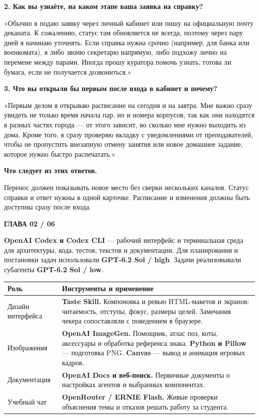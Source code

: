 \documentclass[11pt,a4paper]{article}
\newcommand{\chapterlabel}{Процесс создания}
\newcommand{\eyebrow}[1]{\textcolor{accent}{\small\bfseries #1}\par}
\newcommand{\display}[1]{{\displayfont\fontsize{28}{32}\selectfont #1\par}}
\newcommand{\chapterhead}[3]{%
  \gdef\chapterlabel{#2}%
  \hypertarget{chapter-#1}{}\label{chapter-#1}%
  \pdfbookmark[0]{#2. #3}{#1}%
  \eyebrow{ГЛАВА #2 / 06}\vspace{5pt}\display{#3}\vspace{7pt}}
\newcommand{\minorhead}[1]{\vspace{3pt}{\large\bfseries #1\par}\vspace{1pt}}
\newcommand{\shade}[2][sky]{%
  \par\noindent\colorbox{#1}{\parbox{\dimexpr\linewidth-2\fboxsep\relax}{#2}}\par}
\begin{document}
\vspace{4mm}
\shade[paper]{\textbf{2. Как вы узнаёте, на каком этапе ваша заявка на справку?}\par\smallskip
«Обычно я подаю заявку через личный кабинет или пишу на официальную почту деканата. К сожалению, статус там обновляется не всегда, поэтому через пару дней я начинаю уточнять. Если справка нужна срочно (например, для банка или военкомата), я либо звоню секретарю напрямую, либо подхожу лично на перемене между парами. Иногда прошу куратора помочь узнать, готова ли бумага, если не получается дозвониться.»}

\vspace{4mm}
\shade[paper]{\textbf{3. Что вы открыли бы первым после входа в кабинет и почему?}\par\smallskip
«Первым делом я открываю расписание на сегодня и на завтра. Мне важно сразу увидеть не только время начала пар, но и номера корпусов, так как они находятся в разных частях города — от этого зависит, во сколько мне нужно выходить из дома. Кроме того, я сразу проверяю вкладку с уведомлениями от преподавателей, чтобы не пропустить внезапную отмену занятия или новое домашнее задание, которое нужно быстро распечатать.»}

\vspace{4mm}
\shade{\textbf{Что следует из этих ответов.}\par
Перенос должен показывать новое место без сверки нескольких каналов. Статус справки и ответ нужны в одной карточке. Расписание и изменения должны быть доступны сразу после входа.}

\newpage
\chapterhead{tools}{02}{Инструменты и среда}
\vspace{3mm}
\minorhead{Постановка, код и независимое ревью}
\textbf{OpenAI Codex и Codex CLI} — рабочий интерфейс и терминальная среда для архитектуры, кода, тестов, текстов и документации. Для планирования и постановки задач использовали \textbf{GPT-6.2 Sol / high}. Задачи реализовывали субагенты \textbf{GPT-6.2 Sol / low}.

\vspace{3mm}
\begin{tabularx}{\linewidth}{@{}L{37mm}Y@{}}
\toprule
\textbf{Роль} & \textbf{Инструменты и применение}\\
\midrule
Дизайн интерфейса & \textbf{Taste Skill.} Компоновка и ревью HTML-макетов и экранов: читаемость, отступы, фокус, размеры целей. Замечания чекера сопоставляли с поведением в браузере.\\[5pt]
Изображения & \textbf{OpenAI ImageGen.} Помощник, атлас поз, коты, аксессуары и обработка референса знака. \textbf{Python и Pillow} — подготовка PNG. \textbf{Canvas} — вывод и анимация игровых кадров.\\[5pt]
Документация & \textbf{OpenAI Docs и веб-поиск.} Первичные документы о настройках агентов и выбранных компонентах.\\[5pt]
Учебный чат & \textbf{OpenRouter / ERNIE Flash.} Живые проверки объяснения темы и отказов решать работу за студента.\\
\bottomrule
\end{tabularx}
\end{document}
